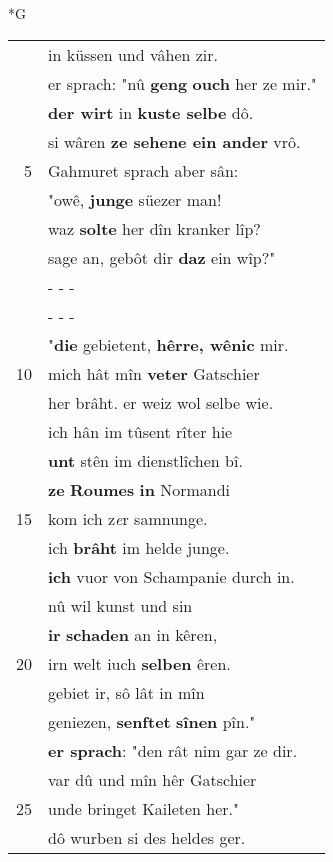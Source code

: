 \documentclass[8pt,a4paper,notitlepage]{article}
\begin{document}
\begin{table}[ht]
\begin{minipage}[t]{0.5\linewidth}
\small
\begin{center}*G
\end{center}
\begin{tabular}{rl}
 & in küssen und vâhen zir.\\ 
 & er sprach: "nû \textbf{geng} \textbf{ouch} her ze mir."\\ 
 & \textbf{der wirt} in \textbf{kuste selbe} dô.\\ 
 & si wâren \textbf{ze sehene ein ander} vrô.\\ 
5 & Gahmuret sprach aber sân:\\ 
 & "owê, \textbf{junge} süezer man!\\ 
 & waz \textbf{solte} her dîn kranker lîp?\\ 
 & sage an, gebôt dir \textbf{daz} ein wîp?"\\ 
 & \multicolumn{1}{l}{ - - - }\\ 
 & \multicolumn{1}{l}{ - - - }\\ 
 & "\textbf{die} gebietent, \textbf{hêrre, wênic} mir.\\ 
10 & mich hât mîn \textbf{veter} Gatschier\\ 
 & her brâht. er weiz wol selbe wie.\\ 
 & ich hân im tûsent rîter hie\\ 
 & \textbf{unt} stên im dienstlîchen bî.\\ 
 & \textbf{ze} \textbf{Roumes} \textbf{in} Normandi\\ 
15 & kom ich z\textit{e}r samnunge.\\ 
 & ich \textbf{brâht} im helde junge.\\ 
 & \textbf{ich} vuor von Schampanie durch in.\\ 
 & nû wil kunst und sin\\ 
 & \textbf{ir} \textbf{schaden} an in kêren,\\ 
20 & irn welt iuch \textbf{selben} êren.\\ 
 & gebiet ir, sô lât in mîn\\ 
 & geniezen, \textbf{senftet} \textbf{sînen} pîn."\\ 
 & \textbf{er sprach}: "den rât nim gar ze dir.\\ 
 & var dû und mîn hêr Gatschier\\ 
25 & unde bringet Kaileten her."\\ 
 & dô wurben si des heldes ger.\\ 

\end{tabular}
\end{minipage}
\end{table}
\end{document}
